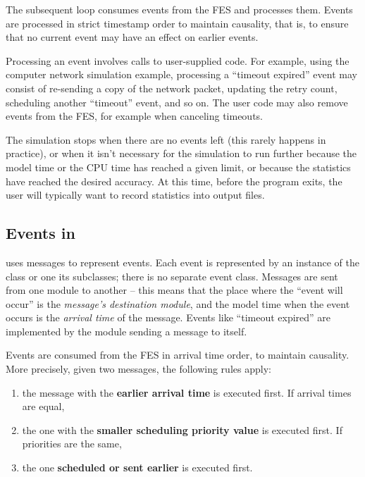 The subsequent loop consumes events from the FES and processes
them. Events are processed in strict timestamp order
to maintain causality, that is, to ensure that no current event may have
an effect on earlier events.

Processing an event involves calls to user-supplied code. For example,
using the computer network simulation example, processing a ``timeout
expired'' event may consist of re-sending a copy of the network
packet, updating the retry count, scheduling another ``timeout''
event, and so on. The user code may also remove events from the FES,
for example when canceling timeouts.

The simulation stops when there are no events left (this rarely happens
in practice), or when it isn't necessary for the simulation
to run further because the model time or the CPU time has reached
a given limit, or because the statistics have reached the desired
accuracy. At this time, before the program exits, the user
will typically want to record statistics into output files.


\subsection{Events in {\opp}}
\label{sec:simple-modules:events-in-opp}

{\opp} uses messages to represent
events. Each event is represented by an instance of the
 class or one its subclasses; there is no separate
event class. Messages are sent from one module to another -- this
means that the place where the ``event will occur'' is the
\textit{message's destination module}, and the model time when the
event occurs is the \textit{arrival time} of the
message. Events like ``timeout expired'' are implemented by the
module sending a message to itself.

Events are consumed from the FES in arrival time order, to
maintain causality. More precisely, given two messages, the following
rules apply:
\begin{enumerate}
\item{the message with the \textbf{earlier arrival time} is executed
    first.  If arrival times are equal,}
\item{the one with the \textbf{smaller scheduling priority value} is
    executed first. If priorities are the same,}
\item{the one \textbf{scheduled or sent earlier} is executed first.}
\end{enumerate}


